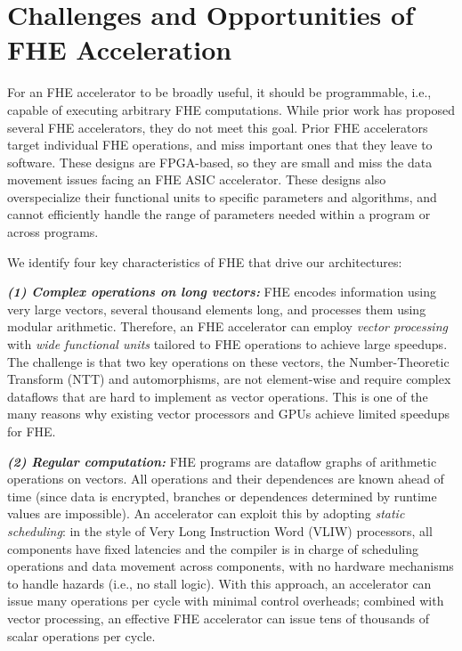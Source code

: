 \section{Challenges and Opportunities of FHE Acceleration}
\label{sec:general}

For an FHE accelerator to be broadly useful, it should be programmable, i.e.,
capable of executing arbitrary FHE computations. While prior work has proposed
several FHE accelerators, they do not meet this goal. Prior FHE
accelerators~\cite{cousins:hpec14:fpga-he,cousins:tetc17:fpga-he,doroz:tc15:accelerating-fhe,roy:hpca19:fpga-he,riazi:asplos20:heax,turan:tc20:heaws}
target individual FHE operations, and miss important ones that they leave to
software. These designs are FPGA-based, so they are small and miss the data
movement issues facing an FHE ASIC accelerator. These designs also
overspecialize their functional units to specific parameters and algorithms,
and cannot efficiently handle the range of parameters needed within a program
or across programs.

We identify four key characteristics of FHE that drive our architectures:

\noindent \textbf{\emph{(1) Complex operations on long vectors:}}
FHE encodes information using very large vectors, several thousand elements
long, and processes them using modular arithmetic. Therefore, an FHE
accelerator can employ \emph{vector processing} with \emph{wide functional
units} tailored to FHE operations to achieve large speedups. The challenge is
that two key operations on these vectors, the Number-Theoretic Transform (NTT)
and automorphisms, are not element-wise and require complex dataflows that are
hard to implement as vector operations. This is one of the many reasons why
existing vector processors and GPUs achieve limited speedups for FHE.

\noindent \textbf{\emph{(2) Regular computation:}}
FHE programs are dataflow graphs of arithmetic operations on vectors. All
operations and their dependences are known ahead of time (since data is
encrypted, branches or dependences determined by runtime values are
impossible). An accelerator can exploit this by adopting \emph{static
scheduling}: in the style of Very Long Instruction Word (VLIW) processors, all
components have fixed latencies and the compiler is in charge of scheduling
operations and data movement across components, with no hardware mechanisms to
handle hazards (i.e., no stall logic). With this approach, an accelerator can
issue many operations per cycle with minimal control overheads; combined with
vector processing, an effective FHE accelerator can issue tens of thousands of
scalar operations per cycle.

